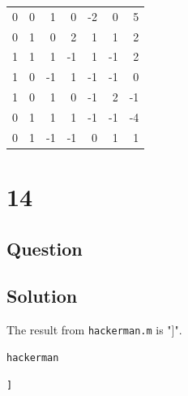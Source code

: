 \documentclass[11pt,a4paper,final]{article}
\begin{document}
\begin{center}
\begin{tabular}{rrrrrrr}
0 & 0 & 1 & 0 & -2 & 0 & 5\\
0 & 1 & 0 & 2 & 1 & 1 & 2\\
1 & 1 & 1 & -1 & 1 & -1 & 2\\
1 & 0 & -1 & 1 & -1 & -1 & 0\\
1 & 0 & 1 & 0 & -1 & 2 & -1\\
0 & 1 & 1 & 1 & -1 & -1 & -4\\
0 & 1 & -1 & -1 & 0 & 1 & 1\\
\end{tabular}
\end{center}

\section{14}
\label{sec:org704e8a5}
\subsection{Question}
\label{sec:orgd52a9ea}
\subsection{Solution}
\label{sec:orge4a3859}
The result from \texttt{hackerman.m} is "]".

\begin{verbatim}
hackerman
\end{verbatim}

\begin{verbatim}
]
\end{verbatim}
\end{document}
